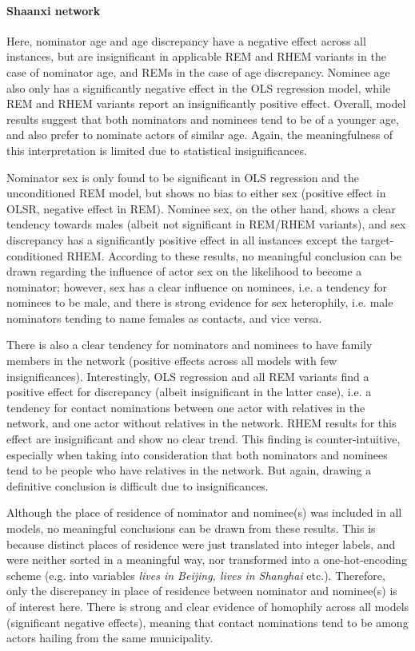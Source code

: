 \paragraph{Shaanxi network} Here, nominator age and age discrepancy have a negative effect across all instances, but are insignificant in applicable REM and RHEM variants in the case of nominator age, and REMs in the case of age discrepancy. Nominee age also only has a significantly negative effect in the OLS regression model, while REM and RHEM variants report an insignificantly positive effect. Overall, model results suggest that both nominators and nominees tend to be of a younger age, and also prefer to nominate actors of similar age. Again, the meaningfulness of this interpretation is limited due to statistical insignificances.

Nominator sex is only found to be significant in OLS regression and the unconditioned REM model, but shows no bias to either sex (positive effect in OLSR, negative effect in REM). Nominee sex, on the other hand, shows a clear tendency towards males (albeit not significant in REM/RHEM variants), and sex discrepancy has a significantly positive effect in all instances except the target-conditioned RHEM. According to these results, no meaningful conclusion can be drawn regarding the influence of actor sex on the likelihood to become a nominator; however, sex has a clear influence on nominees, i.e. a tendency for nominees to be male, and there is strong evidence for sex heterophily, i.e. male nominators tending to name females as contacts, and vice versa. 

There is also a clear tendency for nominators and nominees to have family members in the network (positive effects across all models with few insignificances). Interestingly, OLS regression and all REM variants find a positive effect for discrepancy (albeit insignificant in the latter case), i.e. a tendency for contact nominations between one actor with relatives in the network, and one actor without relatives in the network. RHEM results for this effect are insignificant and show no clear trend. This finding is counter-intuitive, especially when taking into consideration that both nominators and nominees tend to be people who have relatives in the network. But again, drawing a definitive conclusion is difficult due to insignificances.

Although the place of residence of nominator and nominee(s) was included in all models, no meaningful conclusions can be drawn from these results. This is because distinct places of residence were just translated into integer labels, and were neither sorted in a meaningful way, nor transformed into a one-hot-encoding scheme (e.g. into variables \emph{lives in Beijing, lives in Shanghai} etc.). Therefore, only the discrepancy in place of residence between nominator and nominee(s) is of interest here. There is strong and clear evidence of homophily across all models (significant negative effects), meaning that contact nominations tend to be among actors hailing from the same municipality. 

